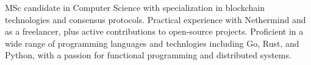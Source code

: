 \documentclass[a4paper,12pt]{article}
\begin{document}
MSc candidate in Computer Science with specialization in blockchain technologies and consensus protocols. Practical experience with Nethermind and as a freelancer, plus active contributions to open-source projects.
Proficient in a wide range of programming languages and technlogies including Go, Rust, and Python, with a passion for functional programming and distributed systems.
\end{document}

